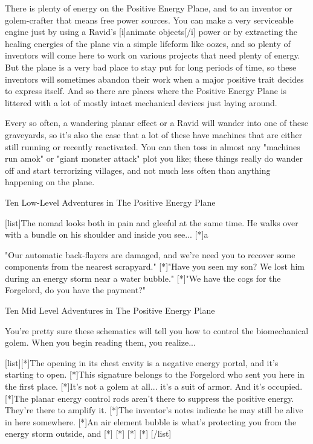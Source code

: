 There is plenty of energy on the Positive Energy Plane, and to an inventor or golem-crafter that means free power sources. You can make a very serviceable engine just by using a Ravid's [i]animate objects[/i] power or by extracting the healing energies of the plane via a simple lifeform like oozes, and so plenty of inventors will come here to work on various projects that need plenty of energy. But the plane is a very bad place to stay put for long periods of time, so these inventors will sometimes abandon their work when a major positive trait decides to express itself. And so there are places where the Positive Energy Plane is littered with a lot of mostly intact mechanical devices just laying around.

Every so often, a wandering planar effect or a Ravid will wander into one of these graveyards, so it's also the case that a lot of these have machines that are either still running or recently reactivated. You can then toss in almost any "machines run amok" or "giant monster attack" plot you like; these things really do wander off and start terrorizing villages, and not much less often than anything happening on the plane.

Ten Low-Level Adventures in The Positive Energy Plane

[list]The nomad looks both in pain and gleeful at the same time. He walks over with a bundle on his shoulder and inside you see...
[*]a 

"Our automatic back-flayers are damaged, and we're need you to recover some components from the nearest scrapyard."
[*]"Have you seen my son? We lost him during an energy storm near a water bubble."
[*]"We have the cogs for the Forgelord, do you have the payment?"

Ten Mid Level Adventures in The Positive Energy Plane

You're pretty sure these schematics will tell you how to control the biomechanical golem. When you begin reading them, you realize...

[list][*]The opening in its chest cavity is a negative energy portal, and it's starting to open.
[*]This signature belongs to the Forgelord who sent you here in the first place.
[*]It's not a golem at all... it's a suit of armor. And it's occupied.
[*]The planar energy control rods aren't there to suppress the positive energy. They're there to amplify it.
[*]The inventor's notes indicate he may still be alive in here somewhere.
[*]An air element bubble is what's protecting you from the energy storm outside, and 
[*]
[*]
[*]
[*]
[/list]

